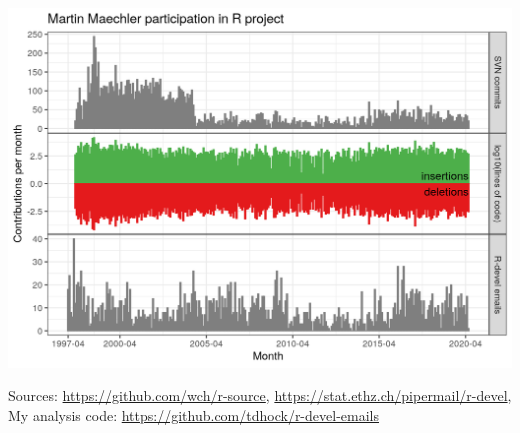 \documentclass{beamer}
\begin{document}
\begin{frame}
  \includegraphics[width=\textwidth]{monthly_code_Martin_Maechler.png}
  
  Sources: \url{https://github.com/wch/r-source},
  \url{https://stat.ethz.ch/pipermail/r-devel}, My analysis code:
  \url{https://github.com/tdhock/r-devel-emails}
  
\end{frame}
\end{document}
